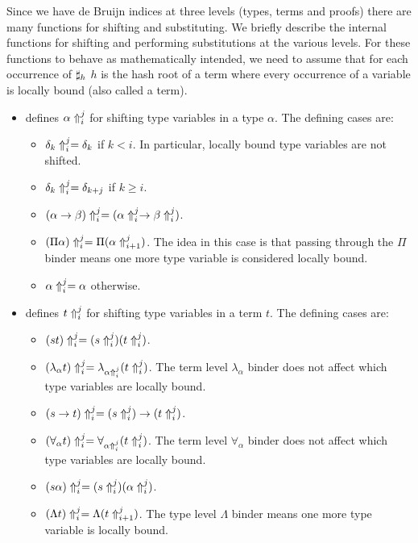 Since we have de Bruijn indices at three levels (types, terms and proofs)
there are many functions for shifting and substituting.
We briefly describe the internal functions for shifting and performing substitutions at the various levels.
For these functions to behave as mathematically intended, we
need to assume that for each occurrence of $\tmh{h}$ 
$h$ is the hash root of a term where every occurrence of a variable is locally bound (also called a {} term).
\begin{itemize}
\item {} defines $\dbtpsh{i}{j}{\alpha}$ for shifting type variables in a type $\alpha$.
The defining cases are:
\begin{itemize}
\item $\dbtpsh{i}{j}{\delta_k} = \delta_k$ if $k<i$. In particular, locally bound type variables are not shifted.
\item $\dbtpsh{i}{j}{\delta_k} = \delta_{k+j}$ if $k\geq i$.
\item $\dbtpsh{i}{j}{(\alpha\to\beta)} = (\dbtpsh{i}{j}{\alpha} \to\dbtpsh{i}{j}{\beta})$.
\item $\dbtpsh{i}{j}{(\Pi\alpha)} = \Pi (\dbtpsh{i+1}{j}{\alpha})$. The idea in this case is that passing
through the $\Pi$ binder means one more type variable is considered locally bound.
\item $\dbtpsh{i}{j}{\alpha} = \alpha$ otherwise.
\end{itemize}
\item {} defines $\dbtpsh{i}{j}{t}$ for shifting type variables in a term $t$.
The defining cases are:
\begin{itemize}
\item $\dbtpsh{i}{j}{(st)} = (\dbtpsh{i}{j}{s}) (\dbtpsh{i}{j}{t})$.
\item $\dbtpsh{i}{j}{(\lambda_\alpha t)} = \lambda_{\dbtpsh{i}{j}{\alpha}} (\dbtpsh{i}{j}{t})$. The term level $\lambda_\alpha$ binder does not affect which type variables are locally bound.
\item $\dbtpsh{i}{j}{(s\to t)} = (\dbtpsh{i}{j}{s}) \to (\dbtpsh{i}{j}{t})$.
\item $\dbtpsh{i}{j}{(\forall_\alpha t)} = \forall_{\dbtpsh{i}{j}\alpha} (\dbtpsh{i}{j}{t})$. The term level $\forall_\alpha$ binder does not affect which type variables are locally bound.
\item $\dbtpsh{i}{j}{(s\alpha)} = (\dbtpsh{i}{j}{s}) (\dbtpsh{i}{j}\alpha)$.
\item $\dbtpsh{i}{j}{(\Lambda t)} = \Lambda (\dbtpsh{i+1}{j}{t})$. The type level $\Lambda$ binder means one more type variable is locally bound.

\end{itemize}
\end{itemize}
